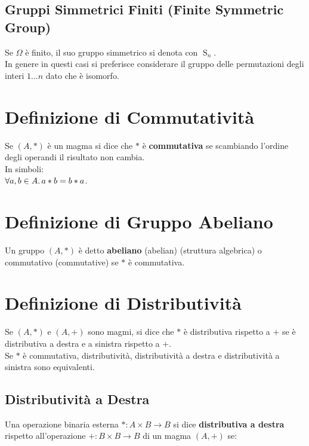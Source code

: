\documentclass[a4paper, twoside, italian, 11pt]{book}
\DeclareMathOperator{\Sg}{S}
\begin{document}
\subsection{Gruppi Simmetrici Finiti (Finite Symmetric Group)}

Se $\Omega$ è finito, il suo gruppo simmetrico si denota con $\Sg_n$. \\
In genere in questi casi si preferisce considerare il gruppo delle permutazioni degli interi $1...n$ dato che è isomorfo.



\section{Definizione di Commutatività}

Se $(A, *)$ è un magma si dice che $*$ è \textbf{commutativa} se scambiando l'ordine degli operandi il risultato non cambia. \\

\noindent
In simboli: \\

$\forall a,b \in A \ldotp a * b = b * a$.



\section{Definizione di Gruppo Abeliano}

Un gruppo $(A, *)$ è detto \textbf{abeliano} (abelian) (struttura algebrica) o commutativo (commutative) se $*$ è commutativa.



\section{Definizione di Distributività}

Se $(A, *)$ e $(A, +)$ sono magmi, si dice che $*$ è distributiva rispetto a $+$ se è distributiva a destra e a sinistra rispetto a $+$. \\

\noindent
Se $*$ è commutativa, distributività, distributività a destra e distributività a sinistra sono equivalenti.


\subsection{Distributività a Destra}

Una operazione binaria esterna $* : A \times B \rightarrow B$ si dice \textbf{distributiva a destra} rispetto all'operazione $+ : B \times B \rightarrow B$ di un magma $(A, +)$ se: \\
\end{document}
